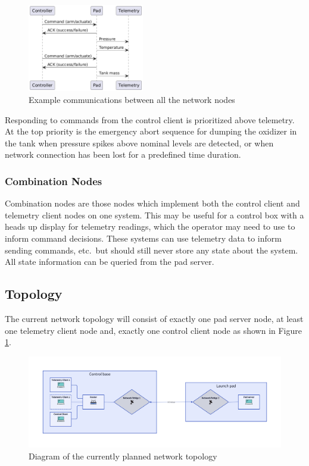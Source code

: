 \begin{figure}[H]
    \center
    \includegraphics[width=2in]{assets/diagrams/all_nodes_seq.png}
    \caption{Example communications between all the network nodes}
\end{figure}

Responding to commands from the control client is prioritized above telemetry. At the top priority is the emergency
abort sequence for dumping the oxidizer in the tank when pressure spikes above nominal levels are detected, or when
network connection has been lost for a predefined time duration.

\subsubsection{Combination Nodes}

Combination nodes are those nodes which implement both the control client and telemetry client nodes on one system.
This may be useful for a control box with a heads up display for telemetry readings, which the operator may need to use
to inform command decisions. These systems can use telemetry data to inform sending commands, etc.\ but should still
never store any state about the system. All state information can be queried from the pad server.

\subsection{Topology}

The current network topology will consist of exactly one pad server node, at least one telemetry client node and, exactly
one control client node as shown in Figure \ref{fig:ntwrk-tplgy}.

\begin{figure}[H]
  \center
  \includegraphics[width=6.75in]{assets/diagrams/network_top.png}
  \caption{Diagram of the currently planned network topology}
  \label{fig:ntwrk-tplgy}
\end{figure}


